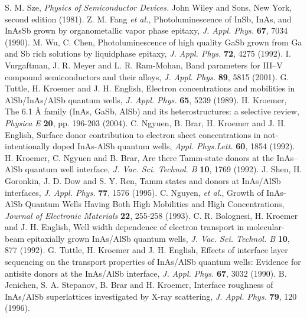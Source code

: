 \documentclass[titlepage,a4paper]{book}
\begin{document}
\begin{thebibliography}{199}
S. M. Sze, \textit{Physics of Semiconductor Devices.} John Wiley and Sons, New York, second edition (1981).
Z. M. Fang \textit{et al.}, Photoluminescence of InSb, InAs, and InAsSb grown by organometallic vapor phase epitaxy, \textit{J. Appl. Phys.} \textbf{67}, 7034 (1990).
M. Wu, C. Chen, Photoluminescence of high quality GaSb grown from Ga and Sb rich solutions by liquidphase epitaxy, \textit{J. Appl. Phys.} \textbf{72}, 4275 (1992).
I. Vurgaftman, J. R. Meyer and L. R. Ram-Mohan, Band parameters for III–V compound semiconductors and their alloys, \textit{J. Appl. Phys.} \textbf{89}, 5815 (2001).
G. Tuttle, H. Kroemer and J. H. English, Electron concentrations and mobilities in AlSb/InAs/AlSb quantum wells, \textit{J. Appl. Phys.} \textbf{65}, 5239 (1989).
H. Kroemer, The 6.1 Å family (InAs, GaSb, AlSb) and its heterostructures: a selective review, \textit{Physica E} \textbf{20}, pp. 196-203 (2004). 
C. Ngyuen, B. Brar, H. Kroemer and J. H. English, Surface donor contribution to electron sheet concentrations in not-intentionally doped InAs-AlSb quantum wells, \textit{Appl. Phys.Lett.} \textbf{60}, 1854 (1992).
H. Kroemer, C. Ngyuen and B. Brar, Are there Tamm-state donors at the InAs–AlSb quantum well interface, \textit{J. Vac. Sci. Technol. B} \textbf{10}, 1769 (1992). 
J. Shen, H. Goronkin, J. D. Dow and S. Y. Ren, Tamm states and donors at InAs/AlSb interfaces, \textit{J. Appl. Phys.} \textbf{77}, 1576 (1995).
C. Nguyen, \textit{et al.}, Growth of InAs-AlSb Quantum Wells Having Both High Mobilities and High Concentrations, \textit{Journal of Electronic Materials} \textbf{22}, 255-258 (1993).
C. R. Bolognesi, H. Kroemer and J. H. English, Well width dependence of electron transport in molecular-beam epitaxially grown InAs/AlSb quantum wells, \textit{J. Vac. Sci. Technol. B} \textbf{10}, 877 (1992).
G. Tuttle, H. Kroemer and J. H. English, Effects of interface layer sequencing on the transport properties of InAs/AlSb quantum wells: Evidence for antisite donors at the InAs/AlSb interface, \textit{J. Appl. Phys.} \textbf{67}, 3032 (1990).
B. Jenichen, S. A. Stepanov, B. Brar and H. Kroemer, Interface roughness of InAs/AlSb superlattices investigated by X-ray scattering, \textit{J. Appl. Phys.} \textbf{79}, 120 (1996).

\end{thebibliography}
\end{document}
